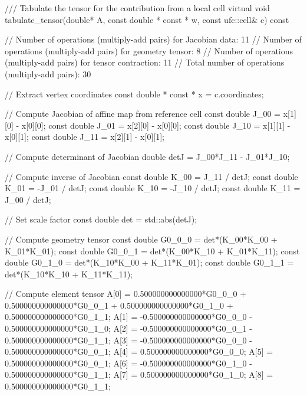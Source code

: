 \begin{c++}
/// Tabulate the tensor for the contribution from a local cell
virtual void tabulate_tensor(double* A,
                             const double * const * w,
                             const ufc::cell& c) const
{
  // Number of operations (multiply-add pairs) for Jacobian data:      11
  // Number of operations (multiply-add pairs) for geometry tensor:    8
  // Number of operations (multiply-add pairs) for tensor contraction: 11
  // Total number of operations (multiply-add pairs):                  30

  // Extract vertex coordinates
  const double * const * x = c.coordinates;

  // Compute Jacobian of affine map from reference cell
  const double J_00 = x[1][0] - x[0][0];
  const double J_01 = x[2][0] - x[0][0];
  const double J_10 = x[1][1] - x[0][1];
  const double J_11 = x[2][1] - x[0][1];

  // Compute determinant of Jacobian
  double detJ = J_00*J_11 - J_01*J_10;

  // Compute inverse of Jacobian
  const double K_00 =  J_11 / detJ;
  const double K_01 = -J_01 / detJ;
  const double K_10 = -J_10 / detJ;
  const double K_11 =  J_00 / detJ;

  // Set scale factor
  const double det = std::abs(detJ);

  // Compute geometry tensor
  const double G0_0_0 = det*(K_00*K_00 + K_01*K_01);
  const double G0_0_1 = det*(K_00*K_10 + K_01*K_11);
  const double G0_1_0 = det*(K_10*K_00 + K_11*K_01);
  const double G0_1_1 = det*(K_10*K_10 + K_11*K_11);

  // Compute element tensor
  A[0] = 0.500000000000000*G0_0_0 + 0.500000000000000*G0_0_1
       + 0.500000000000000*G0_1_0 + 0.500000000000000*G0_1_1;
  A[1] = -0.500000000000000*G0_0_0 - 0.500000000000000*G0_1_0;
  A[2] = -0.500000000000000*G0_0_1 - 0.500000000000000*G0_1_1;
  A[3] = -0.500000000000000*G0_0_0 - 0.500000000000000*G0_0_1;
  A[4] = 0.500000000000000*G0_0_0;
  A[5] = 0.500000000000000*G0_0_1;
  A[6] = -0.500000000000000*G0_1_0 - 0.500000000000000*G0_1_1;
  A[7] = 0.500000000000000*G0_1_0;
  A[8] = 0.500000000000000*G0_1_1;
}
\end{c++}

